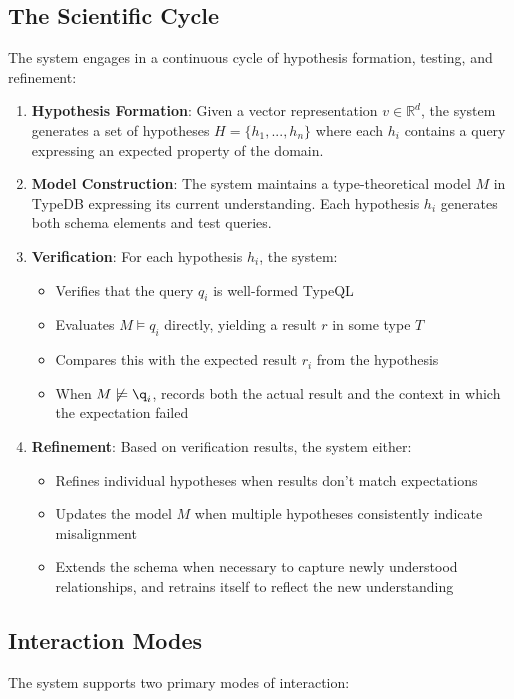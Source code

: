 \documentclass[11pt]{article}
\begin{document}
\subsection{The Scientific Cycle}
The system engages in a continuous cycle of hypothesis formation, testing, and refinement:

\begin{enumerate}
    \item \textbf{Hypothesis Formation}: Given a vector representation $v \in \mathbb{R}^d$, the system generates a set of hypotheses $H = \{h_1, ..., h_n\}$ where each $h_i$ contains a query expressing an expected property of the domain.
    
    \item \textbf{Model Construction}: The system maintains a type-theoretical model $M$ in TypeDB expressing its current understanding. Each hypothesis $h_i$ generates both schema elements and test queries.
    
    \item \textbf{Verification}: For each hypothesis $h_i$, the system:
	\begin{itemize}
		\item Verifies that the query $q_i$ is well-formed TypeQL
		\item Evaluates $M \models q_i$ directly, yielding a result $r$ in some type $T$
		\item Compares this with the expected result $r_i$ from the hypothesis
		\item When $M \not\models \q_i$, records both the actual result and the context in which the expectation failed
	\end{itemize}

	\item \textbf{Refinement}: Based on verification results, the system either:
    \begin{itemize}
        \item Refines individual hypotheses when results don't match expectations
        \item Updates the model $M$ when multiple hypotheses consistently indicate misalignment
        \item Extends the schema when necessary to capture newly understood relationships, and retrains itself to reflect the new understanding
    \end{itemize}
\end{enumerate}


\subsection{Interaction Modes}
The system supports two primary modes of interaction:
\end{document}
